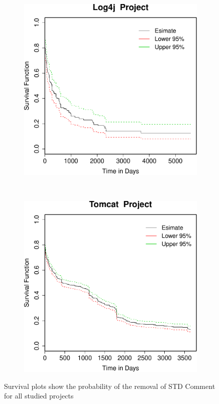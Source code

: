 \begin{figure}[t]
	
	\begin{subfigure}[b]{0.31\textwidth}
		\includegraphics[width=\textwidth]{figures/Survival/log4j.pdf}
	\end{subfigure}
	~
	~
	\begin{subfigure}[b]{0.31\textwidth}
		\includegraphics[width=\textwidth]{figures/Survival/tomcat.pdf}
	\end{subfigure}
		\caption{Survival plots show the probability of the removal of STD Comment for all studied projects}
		\label{fig:survival_plots}
\end{figure}

